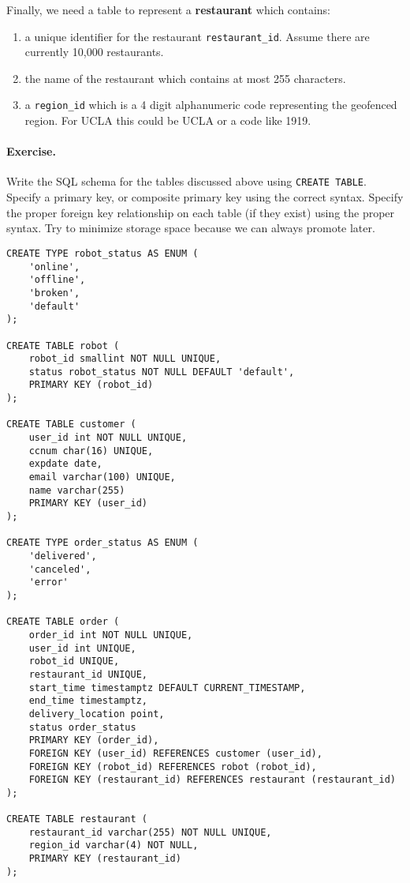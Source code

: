 \documentclass{report}
\renewcommand{\bf}[1]{\textbf{{#1}}}
\renewcommand{\tt}[1]{\texttt{{#1}}}
\begin{document}
\noindent Finally, we need a table to represent a \bf{restaurant} which contains:

\begin{enumerate} 
    \item a unique identifier for the restaurant \tt{restaurant\_id}. Assume there are currently
        10,000 restaurants. 
    \item the name of the restaurant which contains at most 255 characters. 
    \item a \tt{region\_id} which is a 4 digit alphanumeric code representing the geofenced region.
        For UCLA this could be UCLA or a code like 1919. 
\end{enumerate}

\paragraph{Exercise.} Write the SQL schema for the tables discussed above using \tt{CREATE TABLE}.
Specify a primary key, or composite primary key using the correct syntax. Specify the proper foreign
key relationship on each table (if they exist) using the proper syntax. Try to minimize storage
space because we can always promote later.



\begin{lstlisting}[style=psql]
CREATE TYPE robot_status AS ENUM (
    'online',
    'offline',
    'broken',
    'default'
);

CREATE TABLE robot (
    robot_id smallint NOT NULL UNIQUE,
    status robot_status NOT NULL DEFAULT 'default',
    PRIMARY KEY (robot_id)
);

CREATE TABLE customer (
    user_id int NOT NULL UNIQUE,
    ccnum char(16) UNIQUE,
    expdate date,
    email varchar(100) UNIQUE,
    name varchar(255)
    PRIMARY KEY (user_id)
);

CREATE TYPE order_status AS ENUM (
    'delivered',
    'canceled',
    'error'
);

CREATE TABLE order (
    order_id int NOT NULL UNIQUE,
    user_id int UNIQUE,
    robot_id UNIQUE,
    restaurant_id UNIQUE,
    start_time timestamptz DEFAULT CURRENT_TIMESTAMP,
    end_time timestamptz,
    delivery_location point,
    status order_status
    PRIMARY KEY (order_id),
    FOREIGN KEY (user_id) REFERENCES customer (user_id),
    FOREIGN KEY (robot_id) REFERENCES robot (robot_id),
    FOREIGN KEY (restaurant_id) REFERENCES restaurant (restaurant_id)
);

CREATE TABLE restaurant (
    restaurant_id varchar(255) NOT NULL UNIQUE,
    region_id varchar(4) NOT NULL,
    PRIMARY KEY (restaurant_id)
);
\end{lstlisting}
\end{document}

